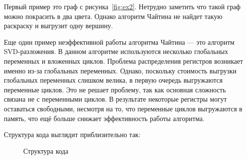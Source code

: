 Первый пример это граф с рисунка~\ref{fig:ex2}. Нетрудно заметить что такой граф можно покрасить в два цвета.
Однако алгоритм Чайтина не найдет такую раскраску и выгрузит одну вершину.

\begin{figure}[H]
    \centering
\end{figure} %

Еще один пример неэффективной работы алгоритма Чайтина — это алгоритм SVD-разложения.
В данном алгоритме используются несколько глобальных переменных и вложенных циклов.
Проблема распределения регистров возникает именно из-за глобальных переменных.  
Однако, поскольку стоимость выгрузки глобальных переменных слишком велика, в первую очередь выгружаются переменные циклов.
Это не решает проблему, так как основная сложность связана не с переменными циклов. 
В результате некоторые регистры могут оставаться свободными, несмотря на то, что переменные циклов выгружаются в память, что ещё больше снижает эффективность работы алгоритма.

Структура кода выглядит приблизительно так:

\begin{figure}[H]
    \centering
    \caption{Структура кода}
    \label{fig:structure}
\end{figure}

